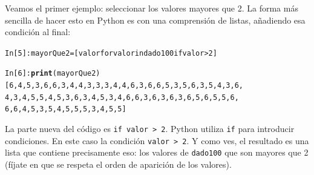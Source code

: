 \documentclass[10pt,a4paper]{article}\usepackage[]{graphicx}\usepackage[]{color}
\makeatletter
\newcommand{\hlkwd}[1]{\textcolor[rgb]{0.737,0.353,0.396}{\textbf{#1}}}%
\newenvironment{kframe}{%
 \def\at@end@of@kframe{}%
 \ifinner\ifhmode%
  \def\at@end@of@kframe{\end{minipage}}%
  \begin{minipage}{\columnwidth}%
 \fi\fi%
 \def\FrameCommand##1{\hskip\@totalleftmargin \hskip-\fboxsep
 \colorbox{shadecolor}{##1}\hskip-\fboxsep
     \hskip-\linewidth \hskip-\@totalleftmargin \hskip\columnwidth}%
 \MakeFramed {\advance\hsize-\width
   \@totalleftmargin\z@ \linewidth\hsize
   \@setminipage}}%
 {\par\unskip\endMakeFramed%
 \at@end@of@kframe}
\newenvironment{knitrout}{}{} %
\newcounter {cont01}
\makeatother
\begin{document}
Veamos el primer ejemplo: seleccionar los valores mayores que 2. La forma más sencilla de hacer esto en Python es con una comprensión de listas, añadiendo esa condición al final:
\begin{knitrout}
\color{fgcolor}\begin{kframe}
\begin{alltt}
In [5]: mayorQue2 = [valor for valor in dado100 if valor > 2]

In [6]: \hlkwd{print}(mayorQue2)
[6, 4, 5, 3, 6, 6, 3, 4, 4, 3, 3, 3, 4, 4, 6, 3, 6, 6, 5, 3, 5, 6, 3, 5, 4, 3, 6,
4, 3, 4, 5, 5, 4, 5, 3, 6, 3, 4, 5, 3, 4, 6, 6, 3, 6, 3, 6, 3, 6, 5, 6, 5, 5, 6,
6, 6, 4, 5, 3, 5, 4, 5, 5, 5, 3, 4, 5, 5]
\end{alltt}
\end{kframe}
\end{knitrout}
La parte nueva del código es {\tt if valor > 2}. Python utiliza {\tt if} para introducir condiciones. En este caso la condición {\tt valor > 2}. Y como ves, el resultado es una lista que contiene precisamente eso: los valores de {\tt dado100} que son mayores que 2 (fíjate en que se respeta el orden de aparición de los valores).
\end{document}
